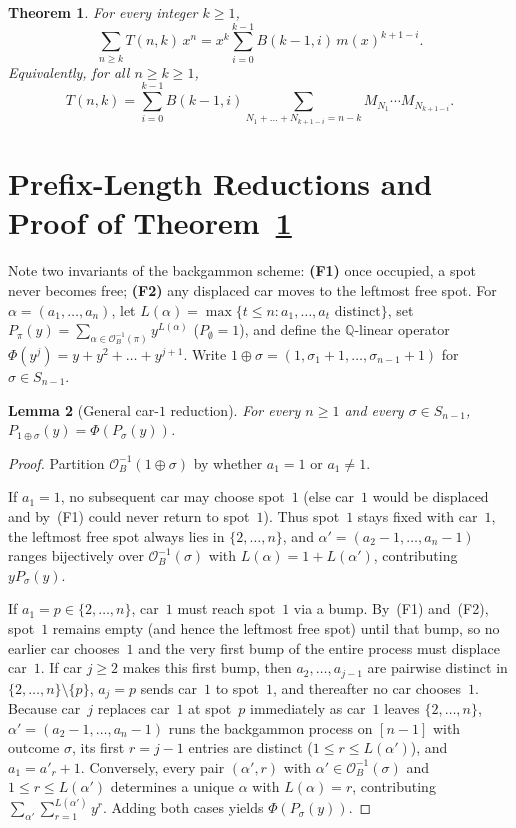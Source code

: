 \documentclass[11pt]{article}
\newtheorem{theorem}{Theorem}
\newtheorem{lemma}[theorem]{Lemma}
\begin{document}
\begin{theorem}\label{thm:main}
For every integer $k \ge 1$,
\[
  \sum_{n \ge k} T(n, k)\, x^n = x^k \sum_{i=0}^{k-1} B(k - 1, i)\, m(x)^{k + 1 - i}.
\]
Equivalently, for all $n \ge k \ge 1$,
\[
  T(n, k) = \sum_{i=0}^{k-1} B(k - 1, i) \sum_{N_1 + \dots + N_{k + 1 - i} = n - k} M_{N_1} \cdots M_{N_{k + 1 - i}}.
\]
\end{theorem}

\section{Prefix-Length Reductions and Proof of Theorem~\ref{thm:main}}

Note two invariants of the backgammon scheme: \textbf{(F1)} once occupied, a spot never becomes free; \textbf{(F2)} any displaced car moves to the leftmost free spot. For $\alpha = (a_1, \dots, a_n)$, let $L(\alpha) = \max\{t \le n : a_1, \dots, a_t \text{ distinct}\}$, set $P_\pi(y) = \sum_{\alpha \in \mathcal{O}_B^{-1}(\pi)} y^{L(\alpha)}$ ($P_\emptyset = 1$), and define the $\mathbb{Q}$-linear operator $\Phi(y^j) = y + y^2 + \dots + y^{j + 1}$. Write $1 \oplus \sigma = (1, \sigma_1 + 1, \dots, \sigma_{n-1} + 1)$ for $\sigma \in S_{n-1}$.

\begin{lemma}[General car-$1$ reduction]\label{lem:A}
For every $n \ge 1$ and every $\sigma \in S_{n-1}$, $P_{1 \oplus \sigma}(y) = \Phi(P_\sigma(y))$.
\end{lemma}

\begin{proof}
Partition $\mathcal{O}_B^{-1}(1 \oplus \sigma)$ by whether $a_1 = 1$ or $a_1 \ne 1$.

If $a_1 = 1$, no subsequent car may choose spot~$1$ (else car~$1$ would be displaced and by~(F1) could never return to spot~$1$). Thus spot~$1$ stays fixed with car~$1$, the leftmost free spot always lies in $\{2, \dots, n\}$, and $\alpha' = (a_2 - 1, \dots, a_n - 1)$ ranges bijectively over $\mathcal{O}_B^{-1}(\sigma)$ with $L(\alpha) = 1 + L(\alpha')$, contributing $y P_\sigma(y)$.

If $a_1 = p \in \{2, \dots, n\}$, car~$1$ must reach spot~$1$ via a bump. By~(F1) and~(F2), spot~$1$ remains empty (and hence the leftmost free spot) until that bump, so no earlier car chooses~$1$ and the very first bump of the entire process must displace car~$1$. If car $j \ge 2$ makes this first bump, then $a_2, \dots, a_{j-1}$ are pairwise distinct in $\{2, \dots, n\} \setminus \{p\}$, $a_j = p$ sends car~$1$ to spot~$1$, and thereafter no car chooses~$1$. Because car~$j$ replaces car~$1$ at spot~$p$ immediately as car~$1$ leaves $\{2, \dots, n\}$, $\alpha' = (a_2 - 1, \dots, a_n - 1)$ runs the backgammon process on $[n - 1]$ with outcome $\sigma$, its first $r = j - 1$ entries are distinct ($1 \le r \le L(\alpha')$), and $a_1 = a'_r + 1$. Conversely, every pair $(\alpha', r)$ with $\alpha' \in \mathcal{O}_B^{-1}(\sigma)$ and $1 \le r \le L(\alpha')$ determines a unique $\alpha$ with $L(\alpha) = r$, contributing $\sum_{\alpha'} \sum_{r=1}^{L(\alpha')} y^r$. Adding both cases yields $\Phi(P_\sigma(y))$.
\end{proof}
\end{document}
